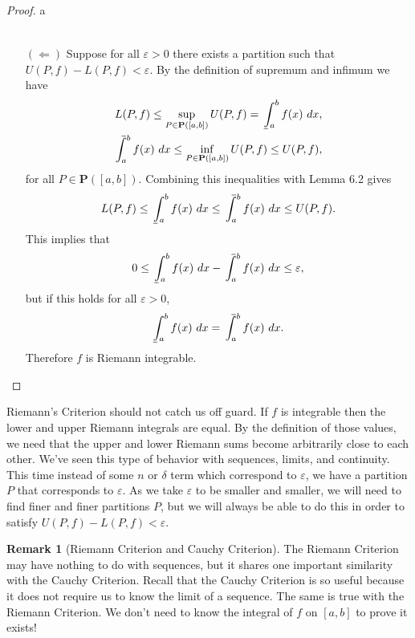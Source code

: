 \documentclass{article}
\def\upint{\mathchoice%
	{\mkern13mu\overline{\vphantom{\intop}\mkern7mu}\mkern-20mu}%
	{\mkern7mu\overline{\vphantom{\intop}\mkern7mu}\mkern-14mu}%
	{\mkern7mu\overline{\vphantom{\intop}\mkern7mu}\mkern-14mu}%
	{\mkern7mu\overline{\vphantom{\intop}\mkern7mu}\mkern-14mu}%
	\int}
\def\lowint{\mkern3mu\underline{\vphantom{\intop}\mkern7mu}\mkern-10mu\int}
\theoremstyle{definition}
\newtheorem{remark}{Remark}[section]
\begin{document}
\begin{proof}{\color{white}a}
\begin{enumerate}
\begin{align*}
			\end{align*}
			\item [$ (\Longleftarrow) $] Suppose for all $ \varepsilon>0 $ there exists a partition such that $ U(P,f)-L(P,f)<\varepsilon $. By the definition of supremum and infimum we have 
			\begin{align*}
				L(P,f)\le\sup\limits_{P\in\textbf{P}([a,b])}U(P,f)=\lowint_{a}^b f(x)\ dx,\\
				\upint_{a}^b f(x)\ dx\le \inf\limits_{P\in\textbf{P}([a,b])}U(P,f)\le U(P,f),
			\end{align*}
			for all $ P\in\mathbf{P}([a,b]) $. Combining this inequalities with Lemma 6.2 gives $$ L(P,f)\le\lowint_{a}^b f(x)\ dx\le\upint_{a}^b f(x)\ dx\le U(P,f).$$ This implies that $$0\le\lowint_{a}^b f(x)\ dx- \upint_{a}^b f(x)\ dx \le \varepsilon,$$ but if this holds for all $ \varepsilon>0 $, $$ \lowint_{a}^b f(x)\ dx = \upint_{a}^b f(x)\ dx.$$ Therefore $ f $ is Riemann integrable. 
		\end{enumerate}
	\end{proof}
	Riemann's Criterion should not catch us off guard. If $ f $ is integrable then the lower and upper Riemann integrals are equal. By the definition of those values, we need that the upper and lower Riemann sums become arbitrarily close to each other. We've seen this type of behavior with sequences, limits, and continuity. This time instead of some $ n $ or $ \delta $ term which correspond to $ \varepsilon $, we have a partition $ P $ that corresponds to $ \varepsilon $. As we take $ \varepsilon $ to be smaller and smaller, we will need to find finer and finer partitions $ P $, but we will always be able to do this in order to satisfy $ U(P,f)-L(P,f)<\varepsilon $.  
	\begin{remark}[Riemann Criterion and Cauchy Criterion]
		The Riemann Criterion may have nothing to do with sequences, but it shares one important similarity with the Cauchy Criterion. Recall that the Cauchy Criterion is so useful because it does not require us to know the limit of a sequence. The same is true with the Riemann Criterion. We don't need to know the integral of $ f $ on $ [a,b] $ to prove it exists! 
	\end{remark}
\end{document}
